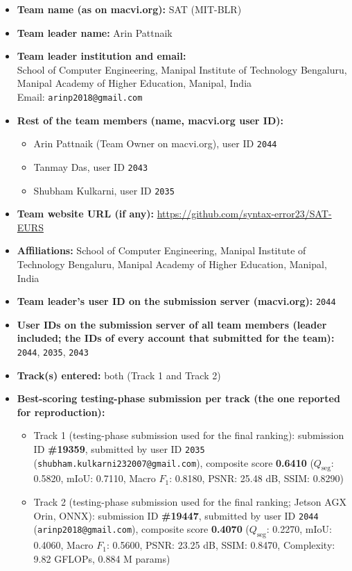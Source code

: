 \documentclass{article}
\begin{document}
\begin{itemize}[leftmargin=*]
\item \textbf{Team name (as on macvi.org):} SAT (MIT-BLR)
\item \textbf{Team leader name:} Arin Pattnaik
\item \textbf{Team leader institution and email:} \\
School of Computer Engineering, Manipal Institute of Technology Bengaluru, Manipal Academy of Higher Education, Manipal, India \\
Email: \texttt{arinp2018@gmail.com}
\item \textbf{Rest of the team members (name, macvi.org user ID):}
  \begin{itemize}
    \item Arin Pattnaik (Team Owner on macvi.org), user ID \texttt{2044}
    \item Tanmay Das, user ID \texttt{2043}
    \item Shubham Kulkarni, user ID \texttt{2035}
  \end{itemize}
\item \textbf{Team website URL (if any):} \url{https://github.com/syntax-error23/SAT-EURS}
\item \textbf{Affiliations:} School of Computer Engineering, Manipal Institute of Technology Bengaluru, Manipal Academy of Higher Education, Manipal, India
\item \textbf{Team leader's user ID on the submission server (macvi.org):} \texttt{2044}
\item \textbf{User IDs on the submission server of all team members (leader included; the IDs of every account that submitted for the team):} \texttt{2044}, \texttt{2035}, \texttt{2043}
\item \textbf{Track(s) entered:} both (Track 1 and Track 2)
\item \textbf{Best-scoring testing-phase submission per track (the one reported for reproduction):}
  \begin{itemize}
    \item Track 1 (testing-phase submission used for the final ranking): submission ID \textbf{\#19359}, submitted by user ID \texttt{2035} (\texttt{shubham.kulkarni232007@gmail.com}), composite score \textbf{0.6410} ($Q_{\text{seg}}$: 0.5820, mIoU: 0.7110, Macro $F_1$: 0.8180, PSNR: 25.48 dB, SSIM: 0.8290)
    \item Track 2 (testing-phase submission used for the final ranking; Jetson AGX Orin, ONNX): submission ID \textbf{\#19447}, submitted by user ID \texttt{2044} (\texttt{arinp2018@gmail.com}), composite score \textbf{0.4070} ($Q_{\text{seg}}$: 0.2270, mIoU: 0.4060, Macro $F_1$: 0.5600, PSNR: 23.25 dB, SSIM: 0.8470, Complexity: 9.82 GFLOPs, 0.884 M params)

\end{itemize}
\end{itemize}
\end{document}
